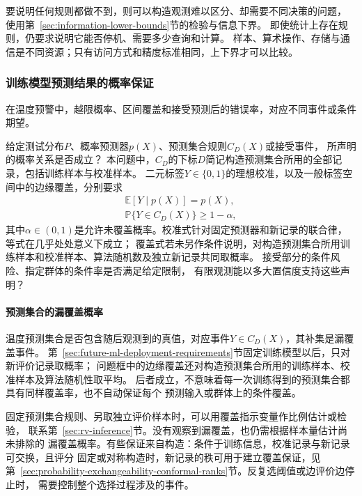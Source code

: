 要说明任何规则都做不到，则可以构造观测难以区分、却需要不同决策的问题，
使用第~\ref{sec:information-lower-bounds}节的检验与信息下界。
即使统计上存在规则，仍要求说明它能否停机、需要多少查询和计算。
样本、算术操作、存储与通信是不同资源；只有访问方式和精度标准相同，上下界才可以比较。

\subsubsection{训练模型预测结果的概率保证}
\label{sec:future-analysis-reliability}

在温度预警中，越限概率、区间覆盖和接受预测后的错误率，对应不同事件或条件期望。

\begin{mathproblem}[预测与决策的概率关系是否满足要求]
  \label{question:future-reliability}
  给定测试分布$P$、概率预测器$p(X)$、预测集合规则$C_D(X)$或接受事件，
  所声明的概率关系是否成立？
  本问题中，$C_D$的下标$D$简记构造预测集合所用的全部记录，包括训练样本与校准样本。
  二元标签$Y\in\{0,1\}$的理想校准，以及一般标签空间中的边缘覆盖，分别要求
  \[
    \begin{gathered}
      \mathbb E[Y\mid p(X)]=p(X),\\
      \mathbb P\{Y\in C_D(X)\}\geq1-\alpha,
    \end{gathered}
  \]
  其中$\alpha\in(0,1)$是允许未覆盖概率。校准式针对固定预测器和新记录的联合律，等式在几乎处处意义下成立；
  覆盖式若未另作条件说明，对构造预测集合所用训练样本和校准样本、算法随机数及独立新记录共同取概率。
  接受部分的条件风险、指定群体的条件率是否满足给定限制，
  有限观测能以多大置信度支持这些声明？
\end{mathproblem}

\paragraph{预测集合的漏覆盖概率}

温度预测集合是否包含随后观测到的真值，对应事件$Y\in C_D(X)$，其补集是漏覆盖事件。
第~\ref{sec:future-ml-deployment-requirements}节固定训练模型以后，只对新评价记录取概率；
问题框中的边缘覆盖还对构造预测集合所用的训练样本、校准样本及算法随机性取平均。
后者成立，不意味着每一次训练得到的预测集合都具有同样覆盖率，也不自动保证每个
预测输入或群体上的条件覆盖。

固定预测集合规则、另取独立评价样本时，可以用覆盖指示变量作比例估计或检验，
联系第~\ref{sec:rv-inference}节。没有观察到漏覆盖，也仍需根据样本量估计尚未排除的
漏覆盖概率。有些保证来自构造：条件于训练信息，校准记录与新记录可交换，且评分
固定或对称构造时，新记录的秩可用于建立覆盖保证，见
第~\ref{sec:probability-exchangeability-conformal-ranks}节。反复选阈值或边评价边停止时，
需要控制整个选择过程涉及的事件。

